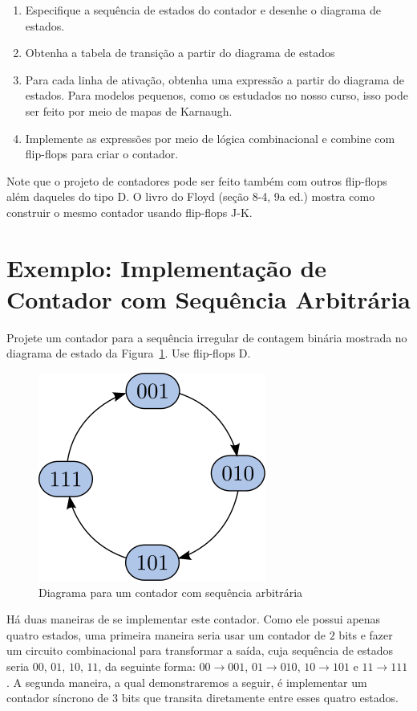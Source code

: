 \documentclass[a4paper]{article}
\begin{document}
\begin{enumerate}
\item Especifique a sequência de estados do contador e
      desenhe o diagrama de estados.
\item Obtenha a tabela de transição a partir do diagrama
      de estados
\item Para cada linha de ativação, obtenha uma expressão
      a partir do diagrama de estados. Para modelos pequenos,
      como os estudados no nosso curso, isso pode ser feito
      por meio de mapas de Karnaugh.
\item Implemente as expressões por meio de lógica combinacional
      e combine com flip-flops para criar o contador.
\end{enumerate}

Note que o projeto de contadores pode ser feito também com
outros flip-flops além daqueles do tipo D. O livro do Floyd
(seção 8-4, 9a ed.) mostra como construir o mesmo contador
usando flip-flops J-K.

\section{Exemplo: Implementação de Contador com Sequência Arbitrária}

Projete um contador para a sequência irregular de contagem
binária mostrada no diagrama de estado da
Figura~\ref{fig:irr_counter_states}. Use flip-flops D.

\begin{figure}[!htp]
\begin{center}
\includegraphics{images/irr_counter_states}
\caption{Diagrama para um contador com sequência arbitrária}
\label{fig:irr_counter_states}
\end{center}
\end{figure}

Há duas maneiras de se implementar este contador. Como
ele possui apenas quatro estados, uma primeira maneira
seria usar um contador de $2$ bits e fazer um circuito
combinacional para transformar a saída, cuja sequência
de estados seria $00$, $01$, $10$, $11$, da seguinte
forma: $00 \rightarrow 001$, $01 \rightarrow 010$,
$10 \rightarrow 101$ e $11 \rightarrow 111$. A segunda
maneira, a qual demonstraremos a seguir, é implementar
um contador síncrono de $3$ bits que
transita diretamente entre esses quatro estados.
\end{document}
